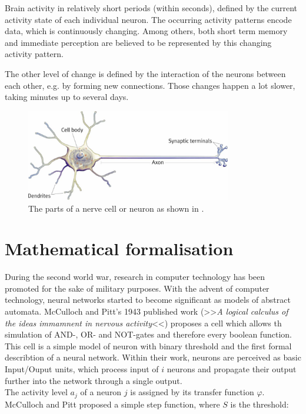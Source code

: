 \documentclass[10pt,a4paper,DIV=11]{scrreprt}
\begin{document}
Brain activity in relatively short periods (within seconds), defined by the current activity state of each individual neuron. The occurring activity patterns encode data, which is continuously changing. Among others, both short term memory and immediate perception are believed to be represented by this changing activity pattern.

The other level of change is defined by the interaction of the neurons between each other, e.g. by forming new connections. Those changes happen a lot slower, taking minutes up to several days.\cite{NEUINF} 

\begin{center}
\begin{figure}
\includegraphics[width=0.8\textwidth,scale=1]{files/neuron.jpg}  
\caption{The parts of a nerve cell or neuron as shown in \cite{NEU}.}
\label{fig:neuron}
\end{figure}
\end{center}


\section{Mathematical formalisation}\label{sec:mcpitts}
During the second world war, research in computer technology has been promoted for the sake of military purposes. With the advent of computer technology, neural networks started to become significant as models of abstract automata. McCulloch and Pitt's 1943 published work (>>\textit{A logical calculus of the ideas immamnent in nervous activity}<<) proposes a cell which allows th simulation of AND-, OR- and NOT-gates and therefore every boolean function. This cell is a simple model of neuron with binary threshold and the first formal describtion of a neural network. Within their work, neurons are perceived as basic Input/Ouput units, which process input of $i$ neurons and propagate their output further into the network through a single output.\\

The activity level $a_j$ of a neuron $j$ is assigned by its transfer function $\varphi$. McCulloch and Pitt proposed a simple step function, where $S$ is the threshold:\\
\end{document}
